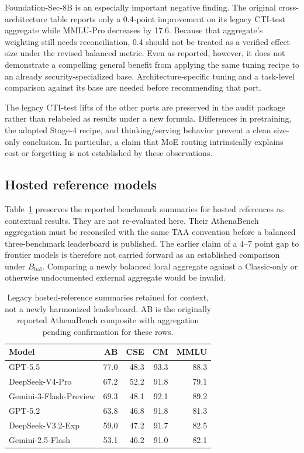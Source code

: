 \documentclass[journal]{IEEEtran}
\begin{document}
Foundation-Sec-8B is an especially important negative finding. The original cross-architecture table reports only a 0.4-point improvement on its legacy CTI-test aggregate while MMLU-Pro decreases by 17.6. Because that aggregate's weighting still needs reconciliation, 0.4 should not be treated as a verified effect size under the revised balanced metric. Even as reported, however, it does not demonstrate a compelling general benefit from applying the same tuning recipe to an already security-specialized base. Architecture-specific tuning and a task-level comparison against its base are needed before recommending that port.

The legacy CTI-test lifts of the other ports are preserved in the audit package rather than relabeled as results under a new formula. Differences in pretraining, the adapted Stage-4 recipe, and thinking/serving behavior prevent a clean size-only conclusion. In particular, a claim that MoE routing intrinsically explains cost or forgetting is not established by these observations.

\subsection{Hosted reference models}
Table~\ref{tab:frontier} preserves the reported benchmark summaries for hosted references as contextual results. They are not re-evaluated here. Their AthenaBench aggregation must be reconciled with the same TAA convention before a balanced three-benchmark leaderboard is published. The earlier claim of a 4--7 point gap to frontier models is therefore not carried forward as an established comparison under $B_{\mathrm{bal}}$. Comparing a newly balanced local aggregate against a Classic-only or otherwise undocumented external aggregate would be invalid.

\begin{table}[!t]
\centering\scriptsize
\caption{Legacy hosted-reference summaries retained for context, not a newly harmonized leaderboard. AB is the originally reported AthenaBench composite with aggregation pending confirmation for these rows.}\label{tab:frontier}
\begin{tabular}{@{}lrrrr@{}}
\toprule Model & AB & CSE & CM & MMLU \\\midrule
GPT-5.5 & 77.0 & 48.3 & 93.3 & 88.3 \\
DeepSeek-V4-Pro & 67.2 & 52.2 & 91.8 & 79.1 \\
Gemini-3-Flash-Preview & 69.3 & 48.1 & 92.1 & 89.2 \\
GPT-5.2 & 63.8 & 46.8 & 91.8 & 81.3 \\
DeepSeek-V3.2-Exp & 59.0 & 47.2 & 91.7 & 82.5 \\
Gemini-2.5-Flash & 53.1 & 46.2 & 91.0 & 82.1 \\\bottomrule
\end{tabular}
\end{table}
\end{document}
